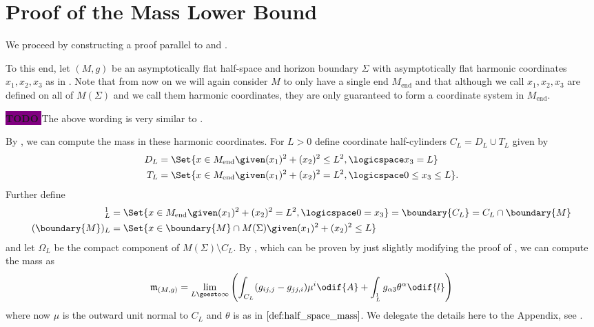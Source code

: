 \documentclass[titlepage,numbers=noenddot,headinclude,oneside,%
footinclude=true,cleardoublepage=empty,%
BCOR=5mm,paper=a4,fontsize=11pt,%
english,%
]{scrartcl}
\let\sphere\relax
\newcommand{\sphere}{\mathbb{S}}
\newcommand{\Mend}{M_{\mathrm{end}}} %
\newcommand{\mass}[2]{\mathfrak{m}_{(#1,#2)}} %
\newcommand{\todomark}{%
    \colorbox{purple}{%
        \textnormal\ttfamily\bfseries\color{white}%
        TODO%
    }%
}
\newcommand{\todo}[1][]{%
    \ifstrempty{#1}{%
        \def\todotext{Todo}%
    }{%
        \def\todotext{Todo: #1}%
    }%
    \todomark%
    {%
        \marginpar{%
            \raggedright\normalfont\sffamily\scriptsize\todotext%
        }%
    }%
}
\begin{document}
\section{Proof of the Mass Lower Bound}
We proceed by constructing a proof parallel to \cite[Section 6]{brayHarmonicFunctionsMass2019} and \cite[Section 6]{hirschSpacetimeHarmonicFunctions2021}. 

To this end, let \( (M,g) \) be an asymptotically flat half-space and horizon boundary \( \Sigma \) with asymptotically flat harmonic coordinates \( x_1,x_2,x_3 \) as in . Note that from now on we will again consider \( M \) to only have a single end \( \Mend \) and that although we call \( x_1,x_2,x_3 \) are defined on all of \( M(\Sigma) \) and we call them harmonic coordinates, they are only guaranteed to form a coordinate system in \( \Mend \).

\todo{The above wording is very similar to \cite[Section 6]{hirschSpacetimeHarmonicFunctions2021}.}

By \cite[Proposition 3.7]{almarazPositiveMassTheorem2016}, we can compute the mass in these harmonic coordinates. For \( L>0 \) define coordinate half-cylinders \( C_L=D_L\cup T_L \) given by
\begin{align*}
    D_L&=\Set{x\in \Mend\given (x_1)^2+(x_2)^2\leq L^2,\logicspace x_3=L}\\
    T_L&=\Set{x\in \Mend\given (x_1)^2+(x_2)^2=L^2,\logicspace 0\leq x_3\leq L}.
\end{align*}
Further define
\begin{align*}
    \sphere_L^1&=\Set{x\in \Mend \given (x_1)^2+(x_2)^2=L^2,\logicspace 0=x_3}=\boundary{C_L}=C_L\cap \boundary{M}\\
    (\boundary{M})_L&=\Set{x\in \boundary{M}\cap M(\Sigma)\given (x_1)^2+(x_2)^2\leq L}
\end{align*}
and let \( \Omega_L \) be the compact component of \( M(\Sigma)\setminus C_L \). 
By , which can be proven by just slightly modifying the proof of \cite[Proposition 3.7]{almarazPositiveMassTheorem2016}, we can compute the mass as
\begin{equation*}
    \mass{M}{g}=\lim_{L \goesto \infty}\left( \int_{C_L}(g_{ij,j}-g_{jj,i})\mu^i\odif{A}+\int_{\sphere^1_L}g_{\alpha 3}\theta^\alpha\odif{l} \right)
\end{equation*}
where now \( \mu \) is the outward unit normal to \( C_L \) and \( \theta \) is as in \( \Cref{def:half_space_mass} \). We delegate the details here to the Appendix, see .
\end{document}
